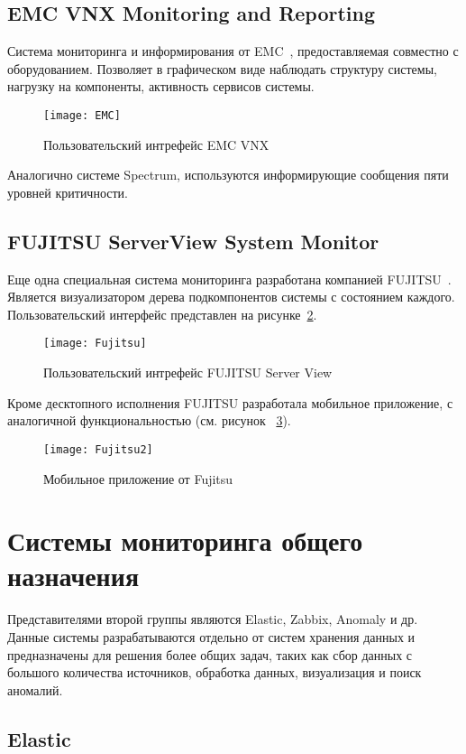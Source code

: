 \subsection{EMC VNX Monitoring and Reporting}
Система мониторинга и информирования от EMC~\cite{EMC}, предоставляемая совместно с оборудованием. Позволяет в графическом виде наблюдать структуру системы, нагрузку на компоненты, активность сервисов системы. 
\begin{figure}[H]
	\centering
	\texttt{[image: EMC]}
	\caption{Пользовательский интрефейс EMC VNX}
	\label{fig:EMC}
\end{figure}
Аналогично системе Spectrum, используются информирующие сообщения пяти уровней критичности.

\subsection{FUJITSU ServerView System Monitor}
Еще одна специальная система мониторинга разработана компанией FUJITSU~\cite{Fujitsu}. Является визуализатором дерева подкомпонентов системы с состоянием каждого. Пользовательский интерфейс представлен на рисунке~\ref{fig:Fujitsu}.  
\begin{figure}[H]
	\centering
	\texttt{[image: Fujitsu]}
	\caption{Пользовательский интрефейс FUJITSU Server View}
	\label{fig:Fujitsu}
\end{figure}
Кроме десктопного исполнения FUJITSU разработала мобильное приложение, с аналогичной функциональностью (см. рисунок ~\ref{fig:Fujitsu2}).
\begin{figure}[H]
	\centering
	\texttt{[image: Fujitsu2]}
	\caption{Мобильное приложение от Fujitsu}
	\label{fig:Fujitsu2}
\end{figure}

\newpage
\section{Системы мониторинга общего назначения}
Представителями второй группы являются Elastic, Zabbix, Anomaly и др. Данные системы разрабатываются отдельно от систем хранения данных и предназначены для решения более общих задач, таких как сбор данных с большого количества источников, обработка данных, визуализация и поиск аномалий. 

\subsection{Elastic}

